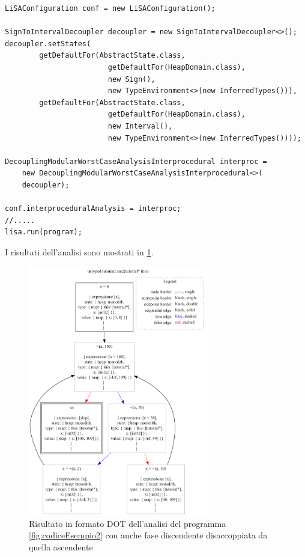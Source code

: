 \begin{lstlisting}[belowskip=-1.1 \baselineskip]
LiSAConfiguration conf = new LiSAConfiguration();

SignToIntervalDecoupler decoupler = new SignToIntervalDecoupler<>();
decoupler.setStates(
        getDefaultFor(AbstractState.class, 
                        getDefaultFor(HeapDomain.class), 
                        new Sign(), 
                        new TypeEnvironment<>(new InferredTypes())), 
        getDefaultFor(AbstractState.class, 
                        getDefaultFor(HeapDomain.class), 
                        new Interval(), 
                        new TypeEnvironment<>(new InferredTypes())));

DecouplingModularWorstCaseAnalysisInterprocedural interproc = 
    new DecouplingModularWorstCaseAnalysisInterprocedural<>(
    decoupler);

conf.interproceduralAnalysis = interproc;
//.....
lisa.run(program);
\end{lstlisting}
I risultati dell'analisi sono mostrati in \ref{fig:risultatoDecoup}.
\begin{figure}[ht]
	\centering
	\includegraphics[width=0.7\textwidth]{Immagini/graphvizDecoup.png}
	\caption{Risultato in formato DOT dell'analisi del programma \ref{fig:codiceEsempio2} con anche fase discendente disaccoppiata da quella ascendente}
	\label{fig:risultatoDecoup}
\end{figure}

